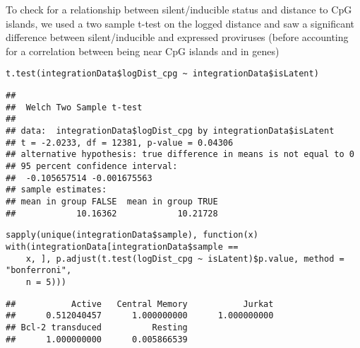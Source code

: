 \documentclass[../../sherrill-Mix_thesis.tex]{subfiles}
\makeatletter
\newenvironment{kframe}{%
 \def\at@end@of@kframe{}%
 \ifinner\ifhmode%
  \def\at@end@of@kframe{\end{minipage}}%
  \begin{minipage}{\columnwidth}%
 \fi\fi%
 \def\FrameCommand##1{\hskip\@totalleftmargin \hskip-\fboxsep
 \colorbox{shadecolor}{##1}\hskip-\fboxsep
     \hskip-\linewidth \hskip-\@totalleftmargin \hskip\columnwidth}%
 \MakeFramed {\advance\hsize-\width
   \@totalleftmargin\z@ \linewidth\hsize
   \@setminipage}}%
 {\par\unskip\endMakeFramed%
 \at@end@of@kframe}
\newenvironment{knitrout}{}{} %
\makeatother
\begin{document}
To check for a relationship between silent/inducible status and distance to CpG islands, we used a two sample t-test on the logged distance and saw a significant difference between silent/inducible and expressed proviruses (before accounting for a correlation between being near CpG islands and in genes)
\begin{knitrout}
\color{fgcolor}\begin{kframe}
\begin{lstlisting}[basicstyle=\ttfamily,breaklines=true]
t.test(integrationData$logDist_cpg ~ integrationData$isLatent)\end{lstlisting}
\begin{lstlisting}[basicstyle=\ttfamily,breaklines=true]
## 
## 	Welch Two Sample t-test
## 
## data:  integrationData$logDist_cpg by integrationData$isLatent
## t = -2.0233, df = 12381, p-value = 0.04306
## alternative hypothesis: true difference in means is not equal to 0
## 95 percent confidence interval:
##  -0.105657514 -0.001675563
## sample estimates:
## mean in group FALSE  mean in group TRUE 
##            10.16362            10.21728
\end{lstlisting}
\begin{lstlisting}[basicstyle=\ttfamily,breaklines=true]
sapply(unique(integrationData$sample), function(x) with(integrationData[integrationData$sample == 
    x, ], p.adjust(t.test(logDist_cpg ~ isLatent)$p.value, method = "bonferroni", 
    n = 5)))\end{lstlisting}
\begin{lstlisting}[basicstyle=\ttfamily,breaklines=true]
##           Active   Central Memory           Jurkat 
##      0.512040457      1.000000000      1.000000000 
## Bcl-2 transduced          Resting 
##      1.000000000      0.005866539
\end{lstlisting}
\end{kframe}
\end{knitrout}
\end{document}

